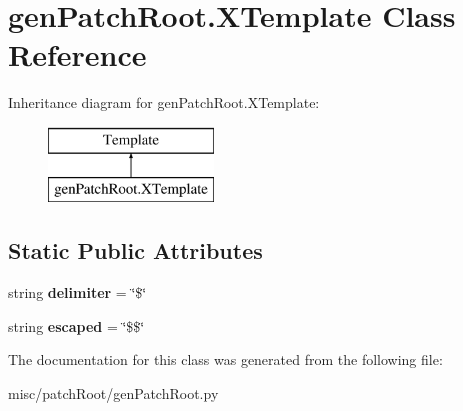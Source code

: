 \hypertarget{classgenPatchRoot_1_1XTemplate}{\section{gen\-Patch\-Root.\-X\-Template Class Reference}
\label{classgenPatchRoot_1_1XTemplate}
}
Inheritance diagram for gen\-Patch\-Root.\-X\-Template\-:\begin{figure}[H]
\begin{center}
\leavevmode
\includegraphics[height=2.000000cm]{classgenPatchRoot_1_1XTemplate}
\end{center}
\end{figure}
\subsection*{Static Public Attributes}
\begin{DoxyCompactItemize}
\item 
\hypertarget{classgenPatchRoot_1_1XTemplate_af744a93768de748bc9e0c4c9cf627111}{string {\bfseries delimiter} = \char`\"{}\$\char`\"{}}\label{classgenPatchRoot_1_1XTemplate_af744a93768de748bc9e0c4c9cf627111}

\item 
\hypertarget{classgenPatchRoot_1_1XTemplate_aa53f5ee42d4ab28dc0505f6c3e95b5c1}{string {\bfseries escaped} = \char`\"{}\$\$\char`\"{}}\label{classgenPatchRoot_1_1XTemplate_aa53f5ee42d4ab28dc0505f6c3e95b5c1}

\end{DoxyCompactItemize}


The documentation for this class was generated from the following file\-:\begin{DoxyCompactItemize}
\item 
misc/patch\-Root/gen\-Patch\-Root.\-py\end{DoxyCompactItemize}
